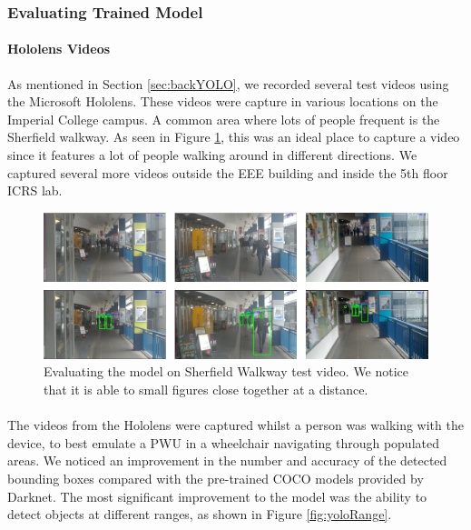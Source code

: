 \subsubsection{Evaluating Trained Model}
\paragraph{Hololens Videos} As mentioned in Section \ref{sec:backYOLO}, we recorded several test videos using the Microsoft Hololens. These videos were capture in various locations on the Imperial College campus. A common area where lots of people frequent is the Sherfield walkway. As seen in Figure \ref{fig:yoloSherfield}, this was an ideal place to capture a video since it features a lot of people walking around in different directions. We captured several more videos outside the EEE building and inside the 5th floor ICRS lab. 

\begin{figure}[ht]
	\centering
	\includegraphics[width=0.95\linewidth]{img/chapter5_implementation/yoloWalkwayMultiple.png}
	\caption{Evaluating the model on Sherfield Walkway test video. We notice that it is able to small figures close together at a distance.}
	\label{fig:yoloSherfield}
\end{figure}

\paragraph{} The videos from the Hololens were captured whilst a person was walking with the device, to best emulate a PWU in a wheelchair navigating through populated areas. We noticed an improvement in the number and accuracy of the detected bounding boxes compared with the pre-trained COCO models provided by Darknet. The most significant improvement to the model was the ability to detect objects at different ranges, as shown in Figure \ref{fig:yoloRange}. 

